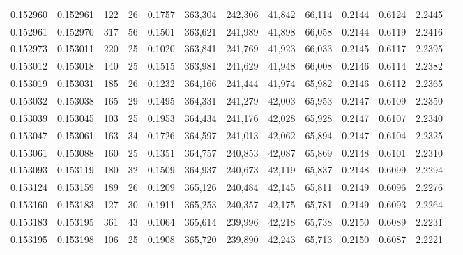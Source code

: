 \begin{tabular}{rrrrrrrrrrrrr}
0.152960 & 0.152961 &   122 &  26 &                                     0.1757 & 363,304 & 242,306 &  41,842 &  66,114 & 0.2144 & 0.6124 & 2.2445 \\
0.152961 & 0.152970 &   317 &  56 &                                     0.1501 & 363,621 & 241,989 &  41,898 &  66,058 & 0.2144 & 0.6119 & 2.2416 \\
0.152973 & 0.153011 &   220 &  25 &                                     0.1020 & 363,841 & 241,769 &  41,923 &  66,033 & 0.2145 & 0.6117 & 2.2395 \\
0.153012 & 0.153018 &   140 &  25 &                                     0.1515 & 363,981 & 241,629 &  41,948 &  66,008 & 0.2146 & 0.6114 & 2.2382 \\
0.153019 & 0.153031 &   185 &  26 &                                     0.1232 & 364,166 & 241,444 &  41,974 &  65,982 & 0.2146 & 0.6112 & 2.2365 \\
0.153032 & 0.153038 &   165 &  29 &                                     0.1495 & 364,331 & 241,279 &  42,003 &  65,953 & 0.2147 & 0.6109 & 2.2350 \\
0.153039 & 0.153045 &   103 &  25 &                                     0.1953 & 364,434 & 241,176 &  42,028 &  65,928 & 0.2147 & 0.6107 & 2.2340 \\
0.153047 & 0.153061 &   163 &  34 &                                     0.1726 & 364,597 & 241,013 &  42,062 &  65,894 & 0.2147 & 0.6104 & 2.2325 \\
0.153061 & 0.153088 &   160 &  25 &                                     0.1351 & 364,757 & 240,853 &  42,087 &  65,869 & 0.2148 & 0.6101 & 2.2310 \\
0.153093 & 0.153119 &   180 &  32 &                                     0.1509 & 364,937 & 240,673 &  42,119 &  65,837 & 0.2148 & 0.6099 & 2.2294 \\
0.153124 & 0.153159 &   189 &  26 &                                     0.1209 & 365,126 & 240,484 &  42,145 &  65,811 & 0.2149 & 0.6096 & 2.2276 \\
0.153160 & 0.153183 &   127 &  30 &                                     0.1911 & 365,253 & 240,357 &  42,175 &  65,781 & 0.2149 & 0.6093 & 2.2264 \\
0.153183 & 0.153195 &   361 &  43 &                                     0.1064 & 365,614 & 239,996 &  42,218 &  65,738 & 0.2150 & 0.6089 & 2.2231 \\
0.153195 & 0.153198 &   106 &  25 &                                     0.1908 & 365,720 & 239,890 &  42,243 &  65,713 & 0.2150 & 0.6087 & 2.2221 \\

\end{tabular}
